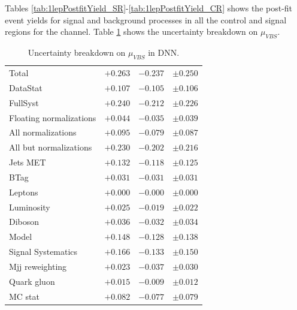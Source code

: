 Tables \ref{tab:1lepPostfitYield_SR}-\ref{tab:1lepPostfitYield_CR} shows the post-fit event yields for signal and background processes
in all the control and signal regions for the \olep channel.
Table \ref{tab:break_1lepdnn} shows the uncertainty breakdown on $\mu_{VBS}$.



\begin{table}[h]
\centering
\begin{tabular}{|l|c|c|c|}
\hline
Total                    & \(+0.263\) & \(-0.237\) & \(\pm 0.250\) \\
DataStat                 & \(+0.107\) & \(-0.105\) & \(\pm 0.106\) \\
FullSyst                 & \(+0.240\) & \(-0.212\) & \(\pm 0.226\) \\
\hline
Floating normalizations  & \(+0.044\) & \(-0.035\) & \(\pm 0.039\) \\
All normalizations       & \(+0.095\) & \(-0.079\) & \(\pm 0.087\) \\
All but normalizations   & \(+0.230\) & \(-0.202\) & \(\pm 0.216\) \\
Jets MET                 & \(+0.132\) & \(-0.118\) & \(\pm 0.125\) \\
BTag                     & \(+0.031\) & \(-0.031\) & \(\pm 0.031\) \\
Leptons                  & \(+0.000\) & \(-0.000\) & \(\pm 0.000\) \\
Luminosity               & \(+0.025\) & \(-0.019\) & \(\pm 0.022\) \\
Diboson                  & \(+0.036\) & \(-0.032\) & \(\pm 0.034\) \\
Model                    & \(+0.148\) & \(-0.128\) & \(\pm 0.138\) \\
Signal Systematics       & \(+0.166\) & \(-0.133\) & \(\pm 0.150\) \\
Mjj reweighting          & \(+0.023\) & \(-0.037\) & \(\pm 0.030\) \\
Quark gluon              & \(+0.015\) & \(-0.009\) & \(\pm 0.012\) \\
MC stat                  & \(+0.082\) & \(-0.077\) & \(\pm 0.079\) \\
\hline
\end{tabular}
\caption{Uncertainty breakdown on $\mu_{VBS}$ in \olep DNN.}
\label{tab:break_1lepdnn}
\end{table}

